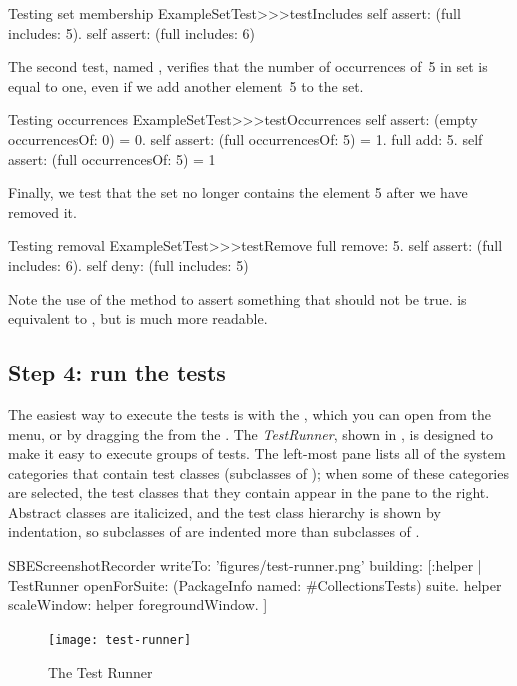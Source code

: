 \documentclass[a4paper,10pt,twoside]{book}
\begin{document}
\begin{method}[testIncludes]{Testing set membership}
ExampleSetTest>>>testIncludes
	self assert: (full includes: 5).
	self assert: (full includes: 6)
\end{method}

The second test, named , verifies that the
number of occurrences of~5 in  set is equal to one, even if we
add another element~5 to the set.

\begin{method}[testOccurrences]{Testing occurrences}
ExampleSetTest>>>testOccurrences
	self assert: (empty occurrencesOf: 0) = 0.
	self assert: (full occurrencesOf: 5) = 1.
	full add: 5.
	self assert: (full occurrencesOf: 5) = 1
\end{method}

Finally, we test that the set no
longer contains the element 5 after we have removed it.

\begin{method}[testRemove]{Testing removal}
ExampleSetTest>>>testRemove
	full remove: 5.
	self assert: (full includes: 6).
	self deny: (full includes: 5)
\end{method}

\noindent
Note the use of the method  to assert something that should not be true.
 is equivalent to , but is much more readable.
\subsection{Step 4: run the tests}

The easiest way to execute the tests is with the \sunit {}, 
which you can open from the  menu, or by dragging the  from the \toolsflap.
The \emph{TestRunner}, shown in , is designed to make it easy  to execute groups of tests.
The left-most pane lists all of the system categories that contain test classes (\ie  subclasses of ); when some of these categories are selected, the test classes that they contain appear in the pane to the right.
Abstract classes are italicized, and the test class hierarchy is shown by indentation, so subclasses of  are indented more than subclasses of .

\begin{ExecuteSmalltalkScript}
SBEScreenshotRecorder writeTo: 'figures/test-runner.png' building: [:helper |
	TestRunner openForSuite: (PackageInfo named: #CollectionsTests) suite.
	helper scaleWindow: helper foregroundWindow.
]
\end{ExecuteSmalltalkScript}
\begin{figure}[tbh]
  \begin{center}
	\texttt{[image: test-runner]}
	\caption{The \squeak \sunit Test Runner}
	\label{fig:test-runner}
  \end{center}
\end{figure}
\end{document}
